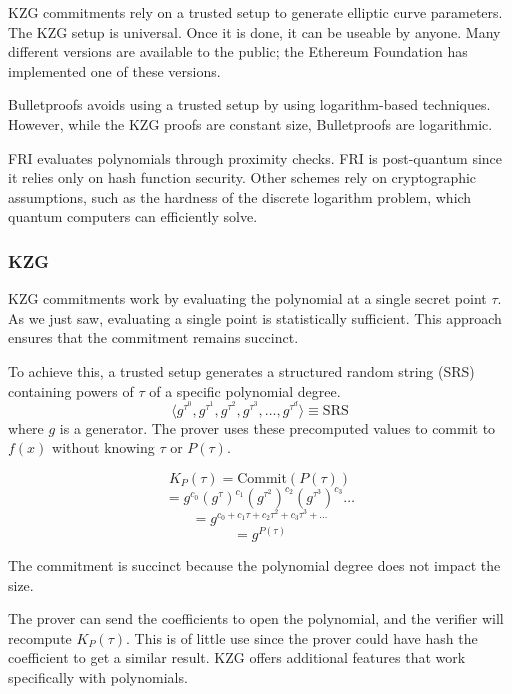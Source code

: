 KZG commitments rely on a trusted setup to generate elliptic curve parameters\cite{KZG}. The KZG setup is universal. Once it is done, it can be useable by anyone. 
Many different versions are available to the public; the Ethereum Foundation has implemented one of these versions. 

Bulletproofs avoids using a trusted setup by using logarithm-based techniques\cite{BP18}. 
However, while the KZG proofs are constant size, Bulletproofs are logarithmic.

FRI evaluates polynomials through proximity checks.\cite{FRI} FRI is post-quantum since it relies only on hash function security. 
Other schemes rely on cryptographic assumptions, such as the hardness of the discrete logarithm problem, which quantum computers can efficiently solve.


\subsubsection{KZG}
KZG commitments work by evaluating the polynomial at a single secret point $\tau$. 
As we just saw, evaluating a single point is statistically sufficient.
This approach ensures that the commitment remains succinct.

To achieve this, a trusted setup generates a structured random string (SRS) containing powers of $\tau$
of a specific polynomial degree. 
\[
\langle g^{\tau^0}, g^{\tau^1}, g^{\tau^2}, g^{\tau^3}, \dots, g^{\tau^d} \rangle \equiv \text{SRS}
\]
where \( g \) is a generator.  
The prover uses these precomputed values to commit to \( f(x) \) without knowing \( \tau \) or \( P(\tau) \).

\begin{equation*}
 K_P(\tau) = \text{Commit}(P(\tau))
\end{equation*}
\begin{equation*}
 = g^{c_0} (g^\tau)^{c_1} (g^{\tau^2})^{c_2} (g^{\tau^3})^{c_3} \dots
\end{equation*}
\begin{equation*}
 = g^{c_0 + c_1 \tau + c_2 \tau^2 + c_3 \tau^3 + \dots}
\end{equation*}
\begin{equation*}
 = g^{P(\tau)}
\end{equation*}

The commitment is succinct because the polynomial degree does not impact the size.


The prover can send the coefficients to open the polynomial, and the verifier will recompute $K_P(\tau)$.
This is of little use since the prover could have hash the coefficient to get a similar result.
KZG offers additional features that work specifically with polynomials.

